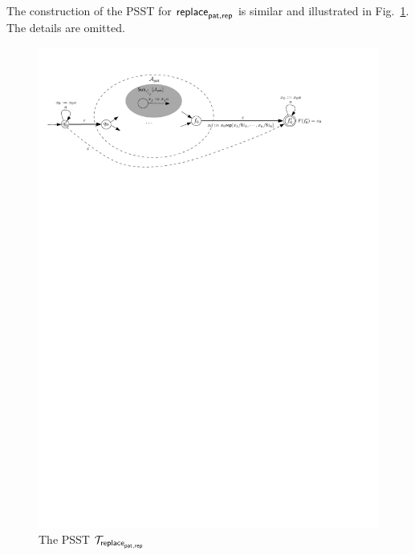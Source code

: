 The construction of the PSST for $\mathsf{replace}_{\mathsf{pat}, \mathsf{rep}}$ is similar and illustrated in Fig.~\ref{fig-psst-replace}. The details are omitted.
	\begin{figure}[ht]
		\centering
		\includegraphics[width=\textwidth]{psst-replace.pdf}
		\caption{The PSST $\mathcal{T}_{\mathsf{replace}_{\mathsf{pat},\mathsf{rep}}}$}
		\label{fig-psst-replace}
	\end{figure}

